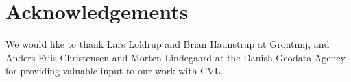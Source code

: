 \section{Acknowledgements}
We would like to thank Lars Loldrup and Brian Haunstrup at Grontmij, and Anders Friis-Christensen and Morten Lindegaard at the Danish Geodata Agency for providing valuable input to our work with CVL.
